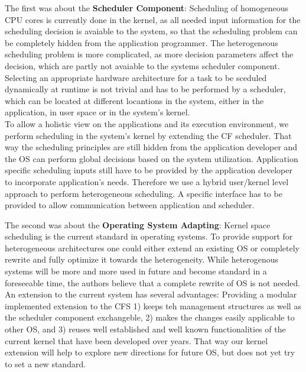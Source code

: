 \documentclass[a4paper,13pt]{article}
\begin{document}
\begin{multicols}{2}
The first was about the {\bf Scheduler Component}: Scheduling of homogeneous CPU cores is currently done in
the kernel, as all needed input information for the scheduling decision is avaiable to the system, 
so that the scheduling problem can be completely hidden from the application programmer. The 
heterogeneous scheduling problem is more complicated, as more decision parameters affect the decision,
which are partly not avaiable to the systems scheduler component.\\
Selecting an appropriate hardware architecture for a task to be sceduled dynamically at runtime
is not trivial and has to be performed  by a scheduler, which can be located at different locantions
in the system, either in the application, in user space or in the system's kernel.\\
To allow a holistic view on the applications and its execution environment, we perform scheduling in 
the system's kernel by extending the CF scheduler. That way the scheduling principles are still 
hidden from the application developer and the OS can perform global decisions based on the system
utilization. Application specific scheduling inputs still have to be provided by the application 
developer to incorporate application's needs. Therefore we use a hybrid user/kernel level approach
to perform heterogeneous scheduling. A specific interface has to be provided to allow communication
between  application and scheduler.

The second was about the {\bf Operating System Adapting}: Kernel space scheduling is the current standard
in operating systems. To provide support for heterogeneous architectures one could either extend an 
existing OS or completely rewrite and fully optimize it towards the heterogeneity. While heterogenous
systems will be more and more used in future and become standard in a foreseeable time, the authors
believe that a complete rewrite of OS is not needed. An extension to the current  system has several
advantages: Providing a modular implemented extension to the CFS 1) keeps teh management structures
as well as the scheduler component exchangeble, 2) makes the changes easily applicable to other OS,
and 3) reuses well established and well known functionalities of the current  kernel that have been
developed over years. That way our kernel extension will help to explore new directions for future OS,
but does not yet try to set a new standard.


\end{multicols}
\end{document}
